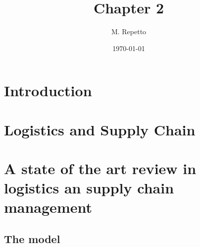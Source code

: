 \documentclass{article}
\begin{document}
\title{Chapter 2}

\author{M. Repetto}

\date{\today}

\maketitle

\begin{abstract}

\end{abstract}

\section{Introduction}

\section{Logistics and Supply Chain}

\section{A state of the art review in logistics an supply chain management}

\subsection{The model}
\ 
\end{document}
